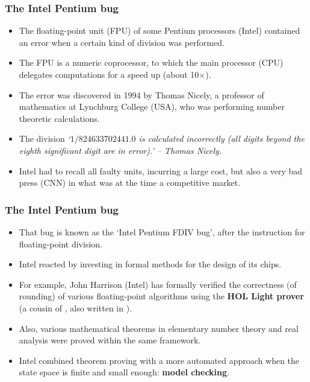 \documentclass[compress,dvipdfmx]{beamer}
\begin{document}
\begin{frame}
  \frametitle{The Intel Pentium bug}

  \begin{itemize}

    \item The floating-point unit (FPU) of some Pentium processors
      (Intel) contained an error when a certain kind of division was
      performed.

    \item The FPU is a numeric coprocessor, to which the main
      processor (CPU) delegates computations for a speed up (about
      10$\times$).

    \item The error was discovered in 1994 by Thomas Nicely, a
      professor of mathematics at Lynchburg College (USA), who was
      performing number theoretic calculations.

    \item The division \emph{`\(1/824633702441.0\) is calculated
      incorrectly (all digits beyond the eighth significant digit are
      in error).' -- Thomas Nicely.}

    \item Intel had to recall all faulty units, incurring a large
      cost, but also a very bad press (CNN) in what was at the time a
      competitive market.

  \end{itemize}

\end{frame}

\begin{frame}
  \frametitle{The Intel Pentium bug}

  \begin{itemize}

    \item That bug is known as the `Intel Pentium FDIV bug', after
      the instruction for floating-point division.

    \item Intel reacted by investing in formal methods for the design
      of its chips.

    \item For example, John Harrison (Intel) has formally verified the
      correctness (of rounding) of various floating\hyp{}point
      algorithms using the \textbf{HOL Light prover} (a cousin of
      \Coq, also written in \OCaml).

    \item Also, various mathematical theorems in elementary number
      theory and real analysis were proved within the same framework.

    \item Intel combined theorem proving with a more automated
      approach when the state space is finite and small enough:
      \textbf{model checking}.

  \end{itemize}

\end{frame}
\end{document}
